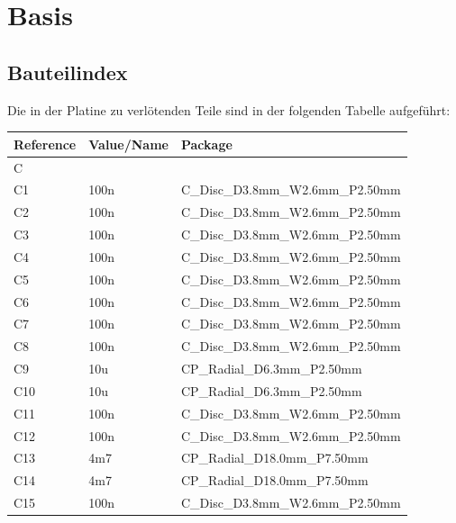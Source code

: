 \documentclass[paper=a4, open=any, numbers=noenddot]{scrbook}
\begin{document}
				\clearpage
		\section{Basis}
			\subsection*{Bauteilindex}

				Die in der Platine zu verlötenden Teile sind in der folgenden Tabelle aufgeführt:

				\begin{longtabu}
					to \textwidth[l]{lX[-1]X}
					Reference & Value/Name             & Package                                                 \\ \hline\hline
					\endhead
					C         &                        &                                                         \\*
					C1        & 100n                   & C\_Disc\_D3.8mm\_W2.6mm\_P2.50mm                        \\
					C2        & 100n                   & C\_Disc\_D3.8mm\_W2.6mm\_P2.50mm                        \\
					C3        & 100n                   & C\_Disc\_D3.8mm\_W2.6mm\_P2.50mm                        \\
					C4        & 100n                   & C\_Disc\_D3.8mm\_W2.6mm\_P2.50mm                        \\
					C5        & 100n                   & C\_Disc\_D3.8mm\_W2.6mm\_P2.50mm                        \\
					C6        & 100n                   & C\_Disc\_D3.8mm\_W2.6mm\_P2.50mm                        \\
					C7        & 100n                   & C\_Disc\_D3.8mm\_W2.6mm\_P2.50mm                        \\
					C8        & 100n                   & C\_Disc\_D3.8mm\_W2.6mm\_P2.50mm                        \\
					C9        & 10u                    & CP\_Radial\_D6.3mm\_P2.50mm                             \\
					C10       & 10u                    & CP\_Radial\_D6.3mm\_P2.50mm                             \\
					C11       & 100n                   & C\_Disc\_D3.8mm\_W2.6mm\_P2.50mm                        \\
					C12       & 100n                   & C\_Disc\_D3.8mm\_W2.6mm\_P2.50mm                        \\
					C13       & 4m7                    & CP\_Radial\_D18.0mm\_P7.50mm                            \\
					C14       & 4m7                    & CP\_Radial\_D18.0mm\_P7.50mm                            \\
					C15       & 100n                   & C\_Disc\_D3.8mm\_W2.6mm\_P2.50mm                        \\
					\hline


\end{longtabu}
\end{document}
